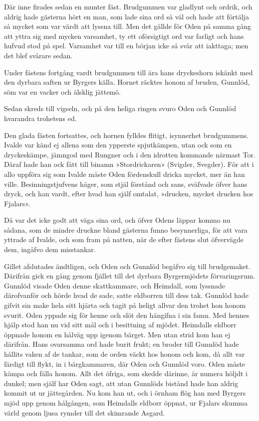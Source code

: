 Där inne firades sedan en munter fäst. Brudgummen var gladlynt och
ordrik, och aldrig hade gästerna hört en man, som lade sina ord så väl
och hade att förtälja så mycket som var värdt att lyssna till. Men det
gällde för Oden på samma gång att yttra sig med mycken varsamhet, ty ett
oförsigtigt ord var farligt och hans hufvud stod på spel. Varsamhet var
till en början icke så svår att iakttaga; men det blef svårare sedan.

Under fästens fortgång vardt brudgummen till ära hans dryckeshorn
iskänkt med den dyrbara saften ur Byrgers källa. Hornet räcktes honom af
bruden, Gunnlöd, söm var en vacker och älsklig jättemö.

Sedan skreds till vigseln, och på den heliga ringen svuro Oden och
Gunnlöd hvarandra trohetens ed.

Den glada fästen fortsattes, och hornen fylldes flitigt,
isynnerhet brudgummens. Ivalde var känd ej allena som den ypperste
spjutkämpen, utan ock som en dryckeskämpe, jämngod med Rungner och i den
idrotten kommande närmast Tor. Däraf hade han ock fått till binamn
»Stordrickaren» (Svigder, Svegder). För att i allo uppföra sig som
Ivalde måste Oden fördenskull dricka mycket, mer än han ville.
Besinningstjufvens häger, som stjäl förstånd och sans, sväfvade öfver
hans dryck, och han vardt, efter hvad han själf omtalat, »drucken,
mycket drucken hos Fjalars».

Då var det icke godt att väga sina ord, och öfver Odens läppar kommo nu
sådana, som de mindre druckne bland gästerna funno besynnerliga, för att
vara yttrade af Ivalde, och som fram på natten, när de efter fästens
slut öfvervägde dem, ingåfvo dem misstankar.

Gillet afslutades ändtligen, och Oden och Gunnlöd begåfvo sig till
brudgemaket. Därifrån gick en gång genom fjället till det dyrbara
Byrgermjödets förvaringsrum. Gunnlöd visade Oden denne skattkammare, och
Heimdall, som lyssnade därofvanför och hörde hvad de sade, satte
eldborren till dess tak. Gunnlöd hade gifvit sin make hela sitt hjärta
och tagit på heligt allvar den trohet hon honom svurit. Oden yppade sig
för henne och slöt den hängifna i sin famn. Med hennes hjälp stod han nu
vid sitt mål och i besittning af mjödet. Heimdalls eldborr öppnade honom
en hålväg upp igenom bärget. Men utan strid kom han ej därifrån. Hans
ovarsamma ord hade burit frukt; en broder till Gunnlöd hade hållits
vaken af de tankar, som de orden väckt hos honom och kom, då allt var
färdigt till flykt, in i bärgkammaren, där Oden och Gunnlöd voro. Oden
måste kämpa och fälla honom. Allt det öfriga, som skedde därinne, är
numera höljdt i dunkel; men själf har Oden sagt, att utan Gunnlöds
bistånd hade han aldrig kommit ut ur jättegården. Nu kom han ut, och i
örnham flög han med Byrgers mjöd upp genom hålgången, som Heimdalls
eldborr öppnat, ur Fjalars skumma värld genom ljusa rymder till det
skimrande Asgard.

